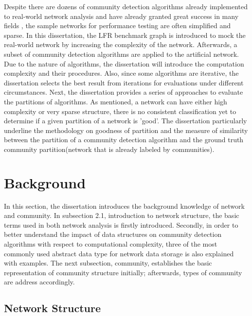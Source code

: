 \documentclass[12pt]{article}
\begin{document}
Despite there are dozens of community detection algorithms already implemented to real-world network analysis and have already granted great success in many fields \cite{2,3}, the sample networks for performance testing are often simplified and sparse. In this dissertation, the LFR benchmark graph is introduced to mock the real-world network by increasing the complexity of the network. Afterwards, a subset of community detection algorithms are applied to the artificial network. Due to the nature of algorithms, the dissertation will introduce the computation complexity and their procedures. Also, since some algorithms are iterative, the dissertation selects the best result from iterations for evaluations under different circumstances. Next, the dissertation provides a series of approaches to evaluate the partitions of algorithms. As mentioned, a network can have either high complexity or very sparse structure, there is no consistent classification yet to determine if a given partition of a network is 'good'. The dissertation particularly underline the methodology on goodness of partition and the measure of similarity between the partition of a community detection algorithm and the ground truth community partition(network that is already labeled by communities).

\section{Background}

In this section, the dissertation introduces the background knowledge of network and community. In subsection 2.1, introduction to network structure, the basic terms used in both network analysis is firstly introduced. Secondly, in order to better understand the impact of data structures on community detection algorithms with respect to computational complexity, three of the most commonly used abstract data type for network data storage is also explained with examples. The next subsection, community, establishes the basic representation of community structure initially; afterwards, types of community are address accordingly.

\subsection{Network Structure}
\end{document}
